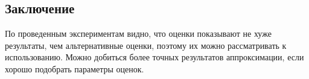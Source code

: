 \begin{center}
    \section*{Заключение}
\end{center}
{}

По проведенным экспериментам видно, что оценки показывают не хуже результаты, чем альтернативные оценки, поэтому их можно рассматривать к использованию.
Можно добиться более точных результатов аппроксимации, если хорошо подобрать параметры оценок.